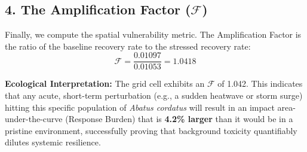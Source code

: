 \documentclass[11pt,a4paper]{article}
\begin{document}
\subsection*{4. The Amplification Factor ($\mathcal{F}$)}
Finally, we compute the spatial vulnerability metric. The Amplification Factor is the ratio of the baseline recovery rate to the stressed recovery rate:
\begin{equation}
    \mathcal{F} = \frac{0.01097}{0.01053} = 1.0418
\end{equation}

\textbf{Ecological Interpretation:} The grid cell exhibits an $\mathcal{F}$ of 1.042. This indicates that any acute, short-term perturbation (e.g., a sudden heatwave or storm surge) hitting this specific population of \textit{Abatus cordatus} will result in an impact area-under-the-curve (Response Burden) that is \textbf{4.2\% larger} than it would be in a pristine environment, successfully proving that background toxicity quantifiably dilutes systemic resilience.
\end{document}
